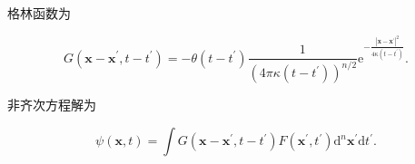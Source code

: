 格林函数为

\[G\left( \mathbf{x} - \mathbf{x}^{\prime},t - t^{\prime} \right) = - \theta\left( t - t^{\prime} \right)\frac{1}{\left( 4\pi\kappa\left( t - t^{\prime} \right) \right)^{n/2}}\mathrm{e}^{- \frac{\left| \mathbf{x} - \mathbf{x}^{\prime} \right|^{2}}{4\kappa\left( t - t^{\prime} \right)}}.\]

非齐次方程解为

\[\psi\left( \mathbf{x},t \right) = \int G\left( \mathbf{x} - \mathbf{x}^{\prime},t - t^{\prime} \right)F\left( \mathbf{x}^{\prime},t^{\prime} \right)\mathrm{d}^{n}\mathbf{x}^{\prime}\mathrm{d}t^{\prime}.\]
